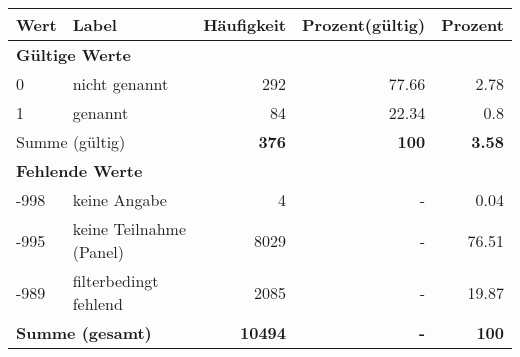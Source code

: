      \begin{longtable}{lXrrr}
     \toprule
     \textbf{Wert} & \textbf{Label} & \textbf{Häufigkeit} & \textbf{Prozent(gültig)} & \textbf{Prozent} \\
     \endhead
     \midrule
     \multicolumn{5}{l}{\textbf{Gültige Werte}}\\

     0 &
     \multicolumn{1}{X}{ nicht genannt   } &


       \num{292} &
       \num[round-mode=places,round-precision=2]{77,66} &
         \num[round-mode=places,round-precision=2]{2,78} \\

     1 &
     \multicolumn{1}{X}{ genannt   } &


       \num{84} &
       \num[round-mode=places,round-precision=2]{22,34} &
         \num[round-mode=places,round-precision=2]{0,8} \\
     \midrule
     \multicolumn{2}{l}{Summe (gültig)} &
       \textbf{\num{376}} &
     \textbf{100} &
       \textbf{\num[round-mode=places,round-precision=2]{3,58}} \\
     \multicolumn{5}{l}{\textbf{Fehlende Werte}}\\
       -998 &
       keine Angabe &
         \num{4} &
        - &
         \num[round-mode=places,round-precision=2]{0,04} \\
       -995 &
       keine Teilnahme (Panel) &
         \num{8029} &
        - &
         \num[round-mode=places,round-precision=2]{76,51} \\
       -989 &
       filterbedingt fehlend &
         \num{2085} &
        - &
         \num[round-mode=places,round-precision=2]{19,87} \\
     \midrule
     \multicolumn{2}{l}{\textbf{Summe (gesamt)}} &
          \textbf{\num{10494}} &
        \textbf{-} &
        \textbf{100} \\
     \bottomrule
     \end{longtable}
     
